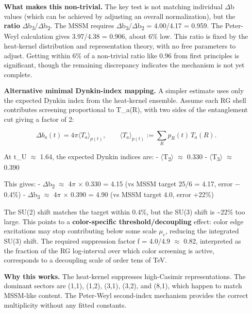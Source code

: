 \documentclass[11pt,a4paper]{article}
\theoremstyle{remark}
\begin{document}
\textbf{What makes this non-trivial.} The key test is not matching individual \ensuremath{\Delta}b values (which can be achieved by adjusting an overall normalization), but the \textbf{ratio} \ensuremath{\Delta}b\textsubscript{3}/\ensuremath{\Delta}b\textsubscript{2}. The MSSM requires \ensuremath{\Delta}b\textsubscript{3}/\ensuremath{\Delta}b\textsubscript{2} = 4.00/4.17 = 0.959. The Peter-Weyl calculation gives 3.97/4.38 = 0.906, about 6\% low. This ratio is fixed by the heat-kernel distribution and representation theory, with no free parameters to adjust. Getting within 6\% of a non-trivial ratio like 0.96 from first principles is significant, though the remaining discrepancy indicates the mechanism is not yet complete.

\textbf{Alternative minimal Dynkin-index mapping.} A simpler estimate uses only the expected Dynkin index from the heat-kernel ensemble. Assume each RG shell contributes screening proportional to T\_a(R), with two sides of the entanglement cut giving a factor of 2:

\[
\Delta b_a(t) = 4\pi \langle T_a \rangle_{p(t)}, \qquad
\langle T_a \rangle_{p(t)} := \sum_R p_R(t) \, T_a(R).
\]

At t\_U \ensuremath{\approx} 1.64, the expected Dynkin indices are:
- \ensuremath{\langle}T\textsubscript{2}\ensuremath{\rangle} \ensuremath{\approx} 0.330
- \ensuremath{\langle}T\textsubscript{3}\ensuremath{\rangle} \ensuremath{\approx} 0.390

This gives:
- \ensuremath{\Delta}b\textsubscript{2} \ensuremath{\approx} 4\ensuremath{\pi} \ensuremath{\times} 0.330 = 4.15 (vs MSSM target 25/6 = 4.17, error \ensuremath{-}0.4\%)
- \ensuremath{\Delta}b\textsubscript{3} \ensuremath{\approx} 4\ensuremath{\pi} \ensuremath{\times} 0.390 = 4.90 (vs MSSM target 4.0, error +22\%)

The SU(2) shift matches the target within 0.4\%, but the SU(3) shift is \textasciitilde22\% too large. This points to a \textbf{color-specific threshold/decoupling} effect: color edge excitations may stop contributing below some scale $\mu_c$, reducing the integrated SU(3) shift. The required suppression factor f = 4.0/4.9 \ensuremath{\approx} 0.82, interpreted as the fraction of the RG log-interval over which color screening is active, corresponds to a decoupling scale of order tens of TeV.

\textbf{Why this works.} The heat-kernel suppresses high-Casimir representations. The dominant sectors are (1,1), (1,2), (3,1), (3,2), and (8,1), which happen to match MSSM-like content. The Peter-Weyl second-index mechanism provides the correct multiplicity without any fitted constants.
\end{document}

